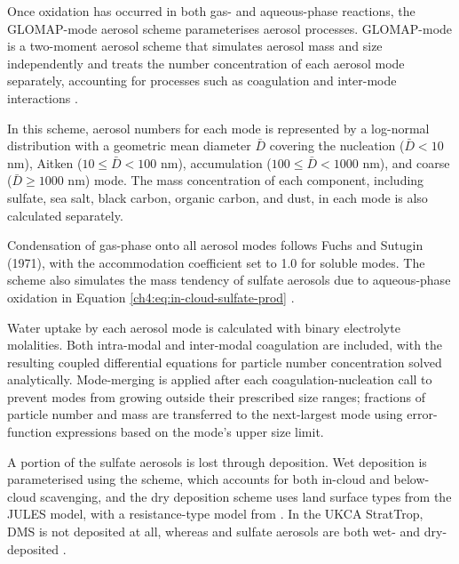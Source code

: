 Once oxidation has occurred in both gas- and aqueous-phase reactions, the GLOMAP-mode aerosol scheme parameterises aerosol processes. GLOMAP-mode is a two-moment aerosol scheme that simulates aerosol mass and size independently and treats the number concentration of each aerosol mode separately, accounting for processes such as coagulation and inter-mode interactions \citep{mannDescriptionEvaluationGLOMAPmode2010}. 

In this scheme, aerosol numbers for each mode is represented by a log-normal distribution with a geometric mean diameter $\bar{D}$ covering the nucleation ($\bar{D} < 10$ \unit{\nano\metre}), Aitken ($10 \leq \bar{D} < 100$ \unit{\nano\metre}), accumulation ($100 \leq \bar{D} < 1000$ \unit{\nano\metre}), and coarse ($\bar{D} \geq 1000$ \unit{\nano\metre}) mode. The mass concentration of each component, including sulfate, sea salt, black carbon, organic carbon, and dust, in each mode is also calculated separately. 

Condensation of gas-phase  onto all aerosol modes follows Fuchs and Sutugin (1971), with the accommodation coefficient set to 1.0 for soluble modes. The scheme also simulates the mass tendency of sulfate aerosols due to aqueous-phase oxidation in Equation \ref{ch4:eq:in-cloud-sulfate-prod} \citep{mannDescriptionEvaluationGLOMAPmode2010, mulcahyDescriptionEvaluationAerosol2020}. 

Water uptake by each aerosol mode is calculated with binary electrolyte molalities. Both intra-modal and inter-modal coagulation are included, with the resulting coupled differential equations for particle number concentration solved analytically. Mode-merging is applied after each coagulation-nucleation call to prevent modes from growing outside their prescribed size ranges; fractions of particle number and mass are transferred to the next-largest mode using error-function expressions based on the mode's upper size limit. 

A portion of the sulfate aerosols is lost through deposition. Wet deposition is parameterised using the \citet{giannakopoulosValidationIntercomparisonWet1999} scheme, which accounts for both in-cloud and below-cloud scavenging, and the dry deposition scheme uses land surface types from the JULES model, with a resistance-type model from \citet{weselyParameterizationSurfaceResistances1989}. In the UKCA StratTrop, DMS is not deposited at all, whereas  and sulfate aerosols are both wet- and dry-deposited \citep{archibaldDescriptionEvaluationUKCA2020}. 


